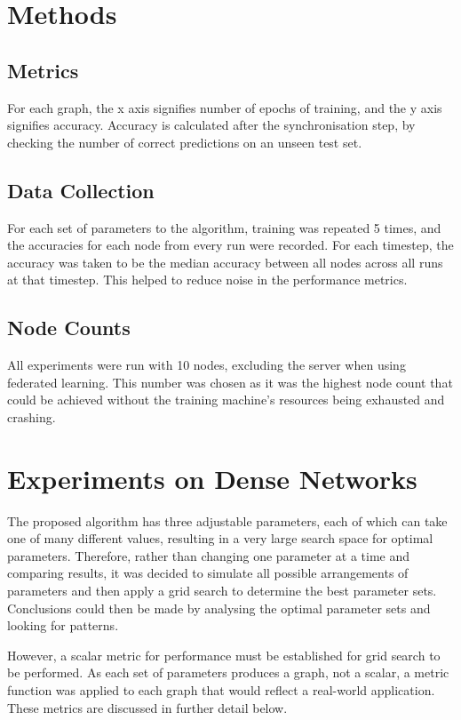 \section{Methods}
\subsection{Metrics}
For each graph, the x axis signifies number of epochs of training, and the y axis signifies accuracy. Accuracy is calculated after the synchronisation step, by checking the number of correct predictions on an unseen test set.

\subsection{Data Collection}
For each set of parameters to the algorithm, training was repeated 5 times, and the accuracies for each node from every run were recorded. For each timestep, the accuracy was taken to be the median accuracy between all nodes across all runs at that timestep. This helped to reduce noise in the performance metrics.

\subsection{Node Counts}
All experiments were run with 10 nodes, excluding the server when using federated learning. This number was chosen as it was the highest node count that could be achieved without the training machine's resources being exhausted and crashing.

\section{Experiments on Dense Networks}

The proposed algorithm has three adjustable parameters, each of which can take one of many different values, resulting in a very large search space for optimal parameters. Therefore, rather than changing one parameter at a time and comparing results, it was decided to simulate all possible arrangements of parameters and then apply a grid search to determine the best parameter sets. Conclusions could then be made by analysing the optimal parameter sets and looking for patterns.

However, a scalar metric for performance must be established for grid search to be performed. As each set of parameters produces a graph, not a scalar, a metric function was applied to each graph that would reflect a real-world application. These metrics are discussed in further detail below.


